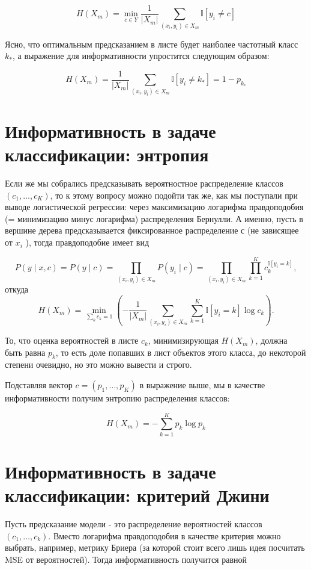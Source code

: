 \[
H\left(X_{m}\right)=\min _{c \in Y} \frac{1}{\left|X_{m}\right|} \sum_{\left(x_{i}, y_{i}\right) \in X_{m}} \mathbb{I}\left[y_{i} \neq c\right]
\]

Ясно, что оптимальным предсказанием в листе будет наиболее частотный класс \(k_{*}\), а выражение для информативности упростится следующим образом:

\[
H\left(X_{m}\right)=\frac{1}{\left|X_{m}\right|} \sum_{\left(x_{i}, y_{i}\right) \in X_{m}} \mathbb{I}\left[y_{i} \neq k_{*}\right]=1-p_{k_{*}}
\]

\section*{Информативность в задаче классификации: энтропия}
Если же мы собрались предсказывать вероятностное распределение классов \(\left(c_{1}, \ldots, c_{K}\right)\), то к этому вопросу можно подойти так же, как мы поступали при выводе логистической регрессии: через максимизацию логарифма правдоподобия (= минимизацию минус логарифма) распределения Бернулли. А именно, пусть в вершине дерева предсказывается фиксированное распределение \(с\) (не зависящее от \(x_{i}\) ), тогда правдоподобие имеет вид

\[
P(y \mid x, c) = P(y \mid c) = \prod_{(x_i, y_i) \in X_m} P(y_i \mid c) = \prod_{(x_i, y_i) \in X_m} \prod_{k=1}^K c_k^{\mathbb{I}[y_i = k]},
\]
откуда
\[
H(X_m) = \min_{\sum_k c_k = 1} \left( - \frac{1}{|X_m|} \sum_{(x_i, y_i) \in X_m} \sum_{k=1}^K \mathbb{I}[y_i = k] \log c_k \right).
\]

То, что оценка вероятностей в листе \(c_{k}\), минимизирующая \(H\left(X_{m}\right)\), должна быть равна \(p_{k}\), то есть доле попавших в лист объектов этого класса, до некоторой степени очевидно, но это можно вывести и строго.

Подставляя вектор \(c=\left(p_{1}, \ldots, p_{K}\right)\) в выражение выше, мы в качестве информативности получим энтропию распределения классов:

\[
H\left(X_{m}\right)=-\sum_{k=1}^{K} p_{k} \log p_{k}
\]

\section*{Информативность в задаче классификации: критерий Джини}
Пусть предсказание модели - это распределение вероятностей классов \(\left(c_{1}, \ldots, c_{k}\right)\). Вместо логарифма правдоподобия в качестве критерия можно выбрать, например, метрику Бриера (за которой стоит всего лишь идея посчитать MSE от вероятностей). Тогда информативность получится равной

